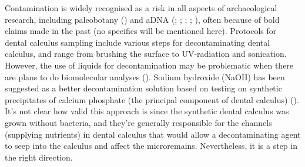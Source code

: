 \documentclass[
  b5paper,
]{book}
\begin{document}
Contamination is widely recognised as a risk in all aspects of
archaeological research, including paleobotany
() and aDNA (; ; ; ; ), often because of bold claims made in the past (no specifics will
be mentioned here). Protocols for dental calculus sampling include
various steps for decontaminating dental calculus, and range from
brushing the surface to UV-radiation and sonication. However, the use of
liquids for decontamination may be problematic when there are plans to
do biomolecular analyses (). Sodium hydroxide (NaOH) has been suggested as a better
decontamination solution based on testing on synthetic precipitates of
calcium phosphate (the principal component of dental calculus)
(). It's not clear how valid this approach is since the synthetic
dental calculus was grown without bacteria, and they're generally
responsible for the channels (supplying nutrients) in dental calculus
that would allow a decontaminating agent to seep into the calculus and
affect the microremains. Nevertheless, it is a step in the right
direction.
\end{document}
